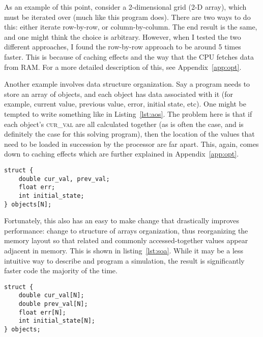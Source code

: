 As an example of this point, consider a 2-dimensional grid (2-D array), which must be iterated over (much like
this program does). There are two ways to do this: either iterate row-by-row, or column-by-column. The end result is
the same, and one might think the choice is arbitrary. However, when I tested the two different approaches, I found
the row-by-row approach to be around 5 times faster. This is because of caching effects and the way that the CPU
fetches data from RAM\cite{intel-1}. For a more detailed description of this, see Appendix~\ref{app:opt}.

Another example involves data structure organization. Say a program needs to store an array of objects, and each object
has data associated with it (for example, current value, previous value, error, initial state, etc). One might be tempted
to write something like in Listing~\ref{lst:aos}. The problem here is that if each object's \textsc{cur\_val} are all
calculated together (as is often the case, and is definitely the case for this solving program), then the location of
the values that need to be loaded in succession by the processor are far apart. This, again, comes down to caching
effects which are further explained in Appendix~\ref{app:opt}.

\begin{minipage}{\linewidth}
\begin{lstlisting}[frame=single,label=lst:aos,caption={Array of structures organization.}]
struct {
	double cur_val, prev_val;
	float err;
	int initial_state;
} objects[N];
\end{lstlisting}
\end{minipage}

Fortunately, this also has an easy to make change that drastically improves performance: change to structure of
arrays organization, thus reorganizing the memory layout so that related and commonly accessed-together values
appear adjacent in memory\cite{intel-opt}. This is shown in listing~\ref{lst:soa}. While it may be a less intuitive way to describe
and program a simulation, the result is significantly faster code the majority of the time.

\begin{minipage}{\linewidth}
\begin{lstlisting}[frame=single,label=lst:soa,caption={Structure of arrays organization.}]
struct {
	double cur_val[N];
	double prev_val[N];
	float err[N];
	int initial_state[N];
} objects;
\end{lstlisting}
\end{minipage}

